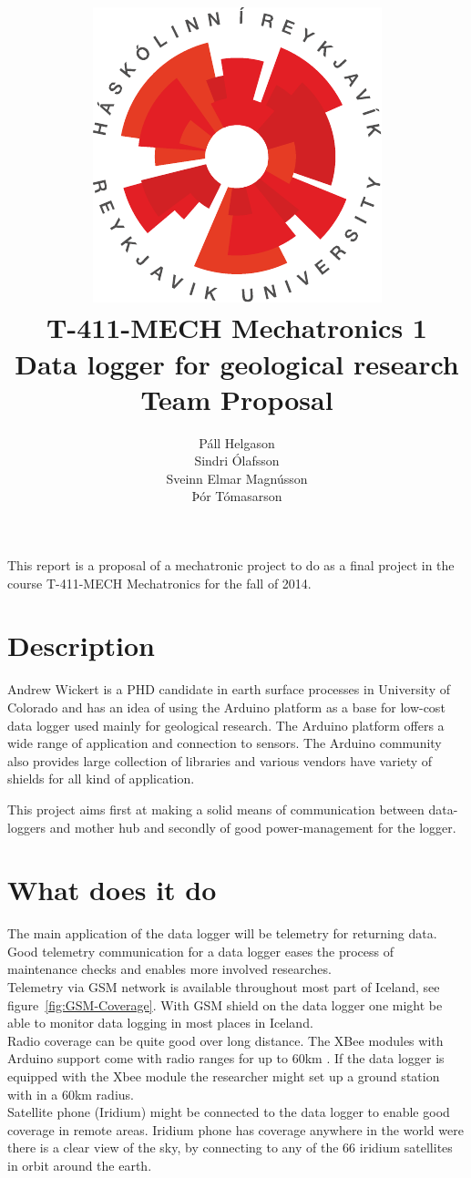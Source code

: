 \documentclass[12pt,a4paper,titlepage]{article}
\author{Páll Helgason\\Sindri Ólafsson\\Sveinn Elmar Magnússon\\Þór Tómasarson}  %
\title{\includegraphics{graphics/ru-logo}\\\vspace{10mm}
T-411-MECH Mechatronics 1\\Data logger for geological research\\Team Proposal}  %
\begin{document}
\maketitle  %
\onehalfspacing %

This report is a proposal of a mechatronic project to do as a
final project in the course T-411-MECH Mechatronics for the fall of 2014.
 

\section{Description}
Andrew Wickert is a PHD candidate in earth surface processes in University of Colorado and has an 
idea of using the Arduino platform as a base for low-cost data logger used mainly
for geological research. The Arduino platform offers a wide range of application and connection to 
sensors. The Arduino community also provides large collection of libraries and various vendors have 
variety of shields for all kind of application. 

This project aims first at making a solid means of communication between data-loggers and mother hub
and secondly of good power-management for the logger.

\section{What does it do}
The main application of the data logger will be telemetry for returning data. Good telemetry communication for a data logger eases the process of maintenance checks and enables more involved researches.\\
Telemetry via GSM network is available throughout most part of Iceland, see figure~\ref{fig:GSM-Coverage}. With GSM shield on the data logger one might be able to monitor data logging in most places in Iceland.\\
Radio coverage can be quite good over long distance. The XBee modules with Arduino support come with radio ranges for up to 60km \cite{Xbee}. If the data logger is equipped with the Xbee module the researcher might set up a ground station with in a 60km radius.\\
Satellite phone (Iridium) might be connected to the data logger to enable good coverage in remote areas. Iridium phone has coverage anywhere in the world were there is a clear view of the sky, by connecting to any of the 66 iridium satellites in orbit around the earth\cite{iridium}.
\end{document}
